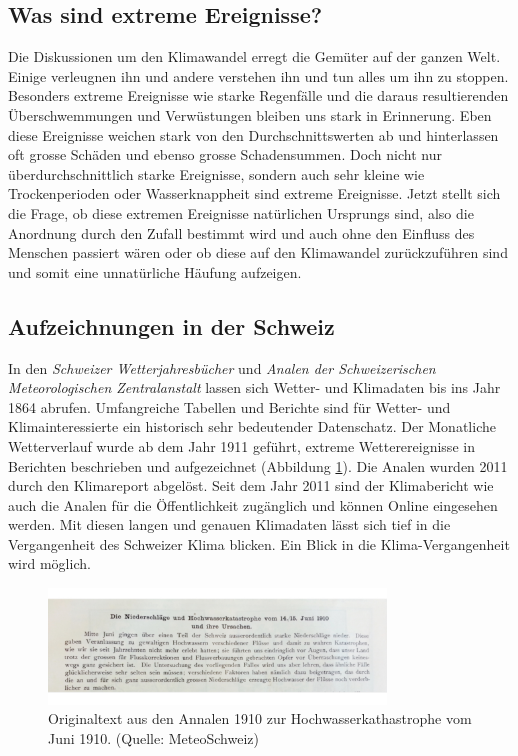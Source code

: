 \begin{refsection}
\section{Was sind extreme Ereignisse?}
Die Diskussionen um den Klimawandel erregt die Gemüter auf der ganzen Welt. Einige verleugnen ihn und andere verstehen ihn und tun alles um ihn zu stoppen. Besonders extreme Ereignisse wie starke Regenfälle und die daraus resultierenden Überschwemmungen und Verwüstungen bleiben uns stark in Erinnerung.
Eben diese Ereignisse weichen stark von den Durchschnittswerten ab und hinterlassen oft grosse Schäden und ebenso grosse Schadensummen. Doch nicht nur überdurchschnittlich starke Ereignisse, sondern auch sehr kleine wie Trockenperioden oder Wasserknappheit sind extreme Ereignisse.
Jetzt stellt sich die Frage, ob diese extremen Ereignisse natürlichen Ursprungs sind, also  die Anordnung durch den Zufall bestimmt wird und auch ohne den Einfluss des Menschen passiert wären oder ob diese auf den Klimawandel zurückzuführen sind und somit eine unnatürliche Häufung aufzeigen.


\subsection{Aufzeichnungen in der Schweiz}
In den \textit{Schweizer Wetterjahresbücher} und \textit{Analen der Schweizerischen Meteorologischen Zentralanstalt} lassen sich Wetter- und Klimadaten bis ins Jahr 1864 abrufen. Umfangreiche Tabellen und Berichte sind für Wetter- und Klimainteressierte ein historisch sehr bedeutender Datenschatz. 
Der Monatliche Wetterverlauf wurde ab dem Jahr 1911 geführt, extreme Wetterereignisse in Berichten beschrieben und aufgezeichnet (Abbildung \ref{Analen}). Die Analen wurden 2011 durch den Klimareport abgelöst. Seit dem Jahr 2011 sind der Klimabericht wie auch die Analen für die Öffentlichkeit zugänglich und können Online eingesehen werden.
Mit diesen langen und genauen Klimadaten lässt sich tief in die Vergangenheit des Schweizer Klima blicken. Ein Blick in die Klima-Vergangenheit wird möglich.

\begin{figure}[htbp]
\centering
\includegraphics[width=0.8\textwidth]{extrem/Analen.jpg}
\caption{Originaltext aus den Annalen 1910 zur Hochwasserkathastrophe vom Juni 1910. (Quelle: MeteoSchweiz)}
\label{Analen}
\end{figure}



\end{refsection}
